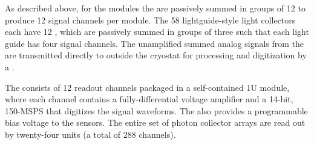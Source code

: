 
As described above, for the  modules the  are passively summed in groups of 12 to produce 12 signal channels per module. The 58 lightguide-style light collectors each have 12 , which are passively summed in groups of three such that each light guide has four signal channels. 
The unamplified summed analog signals from the  are transmitted directly to outside the cryostat for processing and digitization by a
.

The  consists of 12 readout channels packaged in  a self-contained 1U module, where each channel contains a fully-differential voltage amplifier and a \num{14}-bit, \num{150}-MSPS  that digitizes the  signal waveforms. The  also provides a programmable bias voltage to the sensors.
The entire set of photon collector arrays are read out by twenty-four  units (a total of 288 channels).



